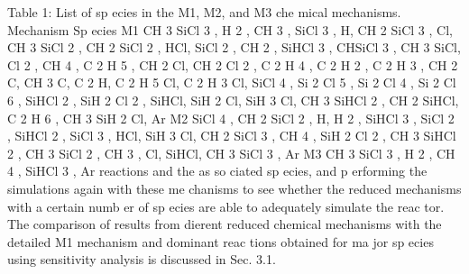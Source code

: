 \documentclass[10pt, letterpaper]{article}
\begin{document}
Table 1: List of sp ecies in the M1, M2, and M3 che mical mechanisms.
Mechanism
Sp ecies
M1
CH
3
SiCl
3
, H
2
, CH
3
, SiCl
3
, H, CH
2
SiCl
3
, Cl, CH
3
SiCl
2
, CH
2
SiCl
2
, HCl, SiCl
2
, CH
2
,
SiHCl
3
, CHSiCl
3
, CH
3
SiCl, Cl
2
, CH
4
, C
2
H
5
, CH
2
Cl, CH
2
Cl
2
, C
2
H
4
, C
2
H
2
, C
2
H
3
,
CH
2
C, CH
3
C, C
2
H, C
2
H
5
Cl, C
2
H
3
Cl, SiCl
4
, Si
2
Cl
5
, Si
2
Cl
4
, Si
2
Cl
6
, SiHCl
2
, SiH
2
Cl
2
,
SiHCl, SiH
2
Cl, SiH
3
Cl, CH
3
SiHCl
2
, CH
2
SiHCl, C
2
H
6
, CH
3
SiH
2
Cl, Ar
M2
SiCl
4
, CH
2
SiCl
2
, H, H
2
, SiHCl
3
, SiCl
2
, SiHCl
2
, SiCl
3
, HCl, SiH
3
Cl,
CH
2
SiCl
3
, CH
4
, SiH
2
Cl
2
, CH
3
SiHCl
2
, CH
3
SiCl
2
, CH
3
, Cl, SiHCl, CH
3
SiCl
3
, Ar
M3
CH
3
SiCl
3
, H
2
, CH
4
, SiHCl
3
, Ar
reactions and the as so ciated sp ecies, and p erforming the simulations again with these me chanisms to see
whether the reduced mechanisms with a certain numb er of sp ecies are able to adequately simulate the reac tor.
The comparison of results from dierent reduced chemical mechanisms with the detailed M1 mechanism and
dominant reac tions obtained for ma jor sp ecies using sensitivity analysis is discussed in Sec. 3.1.
\end{document}
